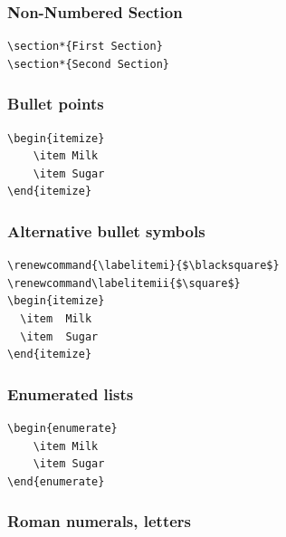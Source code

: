 \subsubsection{Non-Numbered Section}
\begin{verbatim}
\section*{First Section}
\section*{Second Section}
\end{verbatim}

\subsubsection{Bullet points}
\begin{verbatim}
\begin{itemize}
    \item Milk
    \item Sugar
\end{itemize}
\end{verbatim}

\subsubsection{Alternative bullet symbols}
\begin{verbatim}
\renewcommand{\labelitemi}{$\blacksquare$}
\renewcommand\labelitemii{$\square$}
\begin{itemize}
  \item  Milk
  \item  Sugar
\end{itemize}
\end{verbatim}

\subsubsection{Enumerated lists}
\begin{verbatim}
\begin{enumerate}
    \item Milk
    \item Sugar
\end{enumerate}
\end{verbatim}

\subsubsection{Roman numerals, letters}
